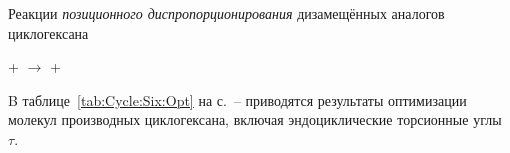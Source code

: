 Реакции \emph{позиционного диспропорционирования} дизамещённых аналогов циклогексана

\begin{center}
   +  \(\longrightarrow\)  + 
\end{center}
  
B таблице~\ref{tab:Cycle:Six:Opt} на с.~\pageref{tab:Cycle:Six:Opt}--\pageref{tab:Cycle:Six:Opt:Ends} приводятся результаты оптимизации молекул производных циклогексана, включая эндоциклические торсионные углы $\tau$.

\begin{center}
   \quad{} \quad{} \quad{} \quad{}
\end{center}

